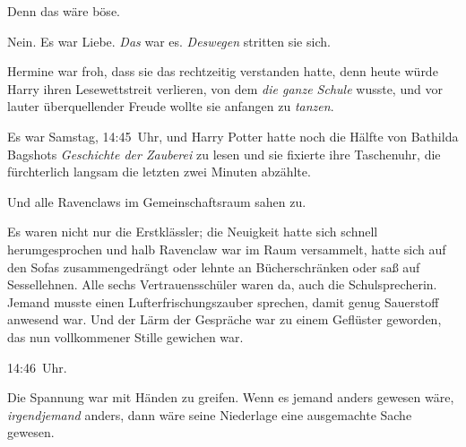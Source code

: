 Denn das wäre böse.

Nein. Es war Liebe. \emph{Das} war es. \emph{Deswegen} stritten sie sich.

Hermine war froh, dass sie das rechtzeitig verstanden hatte, denn heute würde Harry ihren Lesewettstreit verlieren, von dem \emph{die ganze Schule} wusste, und vor lauter überquellender Freude wollte sie anfangen zu \emph{tanzen}.

Es war Samstag, 14:45~Uhr, und Harry Potter hatte noch die Hälfte von Bathilda Bagshots \emph{Geschichte der Zauberei} zu lesen und sie fixierte ihre Taschenuhr, die fürchterlich langsam die letzten zwei Minuten abzählte.

Und alle Ravenclaws im Gemeinschaftsraum sahen zu.

Es waren nicht nur die Erstklässler; die Neuigkeit hatte sich schnell herumgesprochen und halb Ravenclaw war im Raum versammelt, hatte sich auf den Sofas zusammengedrängt oder lehnte an Bücherschränken oder saß auf Sessellehnen. Alle sechs Vertrauensschüler waren da, auch die Schulsprecherin. Jemand musste einen Lufterfrischungszauber sprechen, damit genug Sauerstoff anwesend war. Und der Lärm der Gespräche war zu einem Geflüster geworden, das nun vollkommener Stille gewichen war.

14:46~Uhr.

Die Spannung war mit Händen zu greifen. Wenn es jemand anders gewesen wäre, \emph{irgendjemand} anders, dann wäre seine Niederlage eine ausgemachte Sache gewesen.


